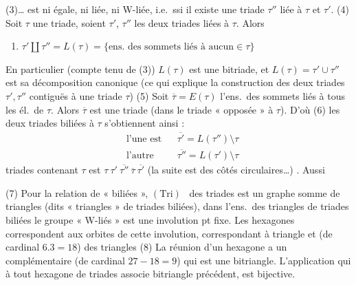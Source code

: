 \documentclass[11pt,a4paper]{article}
\begin{document}
(3)… est ni égale, ni liée, ni W-liée, i.e.\ ssi  il existe
une triade $\tau''$ liée à $\tau$ et $\tau'$. (4) Soit $\tau$ une triade,
soient $\tau'$, $\tau''$ les deux triades liées à $\tau$. Alors
\begin{enumerate}
\item[a)] $\tau' \amalg \tau'' = L(\tau) = \{\text{ens.\ des sommets liés à aucun} \in \tau\}$
\end{enumerate}
\struck{\ill{}} En particulier (compte tenu de (3)) $L(\tau)$ est une
bitriade, et $L(\tau) = \tau' \cup \tau''$ est sa décomposition canonique
(ce qui explique la construction des deux triades $\tau', \tau''$
contiguës à une triade $\tau$) (5) Soit $\overline{\tau} = E(\tau)$ l'ens.\
des sommets liés à tous les él.\ de $\tau$. Alors $\overline{\tau}$ est une
triade (dans le triade « opposée » à $\tau$). D'où (6) les deux
triades biliées à $\tau$ s'obtiennent ainsi :
\[
\begin{aligned}
&\text{l'une est} && \overline{\tau'} = L(\tau'') \setminus \tau\\
&\text{l'autre} && \overline{\tau''} = L(\tau') \setminus \tau
\end{aligned}
\]
 
 triades contenant $\tau$ est \struck{\ill{}}
$\tau\ \tau'\ \overline{\tau''}\ \overline{\tau}\ \overline{\tau'}$ (la suite est des côtés
circulaires…) \struck{\ill{}}. Aussi \ill{} \ill{}



(7) Pour la relation de « biliées »,   $(\mathrm{Tri})$
\uncertain{l'ens.}\ des triades est un graphe somme de
triangles (dits   « triangles » de triades biliées), dans
l'ens.\ des triangles de triades biliées \struck{\ill{}} le groupe
\ill{} « W-liés » est une involution \uncertain{à} pt fixe.
Les hexagones correspondent aux orbites de cette involution,
 correspondant \struck{\ill{}} à  triangle et \ill{} (de cardinal $6.3 = 18$)  des triangles
(8) La réunion \ill{}
d'un hexagone \ill{} a un complémentaire
(de cardinal $27 - 18 = 9$) qui est une bitriangle.
L'application qui à tout hexagone de
triades associe \struck{\ill{}} bitriangle précédent,
est bijective. 
\end{document}
